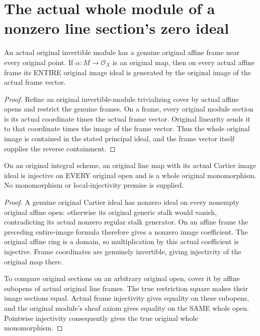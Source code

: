 \section{The actual whole module of a nonzero line section's zero ideal}

\begin{theorem}
\label{thm:fc-original-line-image-frames}
\leanok
{}
An actual original invertible module has a genuine original affine frame
near every original point. If $\alpha:M\to\mathcal O_X$ is an original
map, then on every actual affine frame its ENTIRE original image ideal
is generated by the original image of the actual frame vector.
\end{theorem}
\begin{proof}
Refine an original invertible-module trivializing cover by actual affine
opens and restrict the genuine frames. On a frame, every original
module section is its actual coordinate times the actual frame vector.
Original linearity sends it to that coordinate times the image of the
frame vector. Thus the whole original image is contained in the stated
principal ideal, and the frame vector itself supplies the reverse
containment.
\end{proof}

\begin{theorem}
\label{thm:fc-original-line-cartier-image-mono}
\leanok
{}
On an original integral scheme, an original line map with its actual
Cartier image ideal is injective on EVERY original open and is a whole
original monomorphism. No monomorphism or local-injectivity premise is
supplied.
\end{theorem}
\begin{proof}
A genuine original Cartier ideal has nonzero ideal on every nonempty
original affine open: otherwise its original generic stalk would vanish,
contradicting its actual nonzero regular stalk generator. On an affine
frame the preceding entire-image formula therefore gives a nonzero
image coefficient. The original affine ring is a domain, so multiplication
by this actual coefficient is injective. Frame coordinates are genuinely
invertible, giving injectivity of the original map there.

To compare original sections on an arbitrary original open, cover it by
affine subopens of actual original line frames. The true restriction
square makes their image sections equal. Actual frame injectivity gives
equality on these subopens, and the original module's sheaf axiom gives
equality on the SAME whole open. Pointwise injectivity consequently gives
the true original whole monomorphism.
\end{proof}

